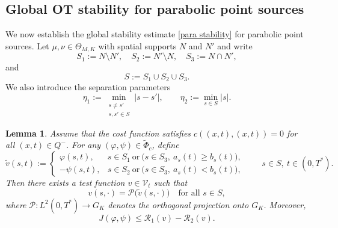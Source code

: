\documentclass[12pt]{amsart}
\newtheorem{lem}[thm]{Lemma}
\begin{document}
\subsection{Global OT stability for parabolic point sources}

We now establish the global stability estimate \eqref{para stability} for parabolic point sources.
Let $\mu,\nu\in\Theta_{M,K}$ with spatial supports
$N$ and $N'$ and write
\[
S_1 := N \setminus N', \quad 
S_2 := N' \setminus N, \quad 
S_3 := N \cap N',
\]
and
\[
S := S_1 \cup S_2 \cup S_3.
\]
We also introduce the separation parameters
\[
\eta_1 := \min_{\substack{s \neq s' \\ s, s' \in S}} |s - s'|, \qquad 
\eta_2 := \min_{s \in S} |s|.
\]

\begin{lem}\label{para combine test functino lem}
Assume that the cost function satisfies \(c((x,t),(x,t))=0\) for all \((x,t)\in Q^{-}\).
For any \( (\varphi,\psi)\in\widetilde{\Phi}_c \), define
\[
\tilde{v}(s,t):=
\begin{cases}
\varphi(s,t), & s\in S_1 \ \text{or}\ \bigl(s\in S_3,\ a_s(t)\ge b_s(t)\bigr), \\[0.3em]
-\psi(s,t), & s\in S_2 \ \text{or}\ \bigl(s\in S_3,\ a_s(t)< b_s(t)\bigr),
\end{cases}
\qquad s\in S,\ t\in(0,T^*).
\]
Then there exists a test function \(v\in\mathcal{V}_t\) such that
\[
v(s,\cdot)=\mathcal{P}\bigl(\tilde{v}(s,\cdot)\bigr)\quad\text{for all }s\in S,
\]
where \(\mathcal{P}:L^2(0,T^*)\to G_K\) denotes the orthogonal projection onto \(G_K\).
Moreover,
\begin{equation}\label{para J and v}
    J(\varphi,\psi)\le \mathcal{R}_1(v)-\mathcal{R}_2(v).
\end{equation}
\end{lem}
\end{document}
